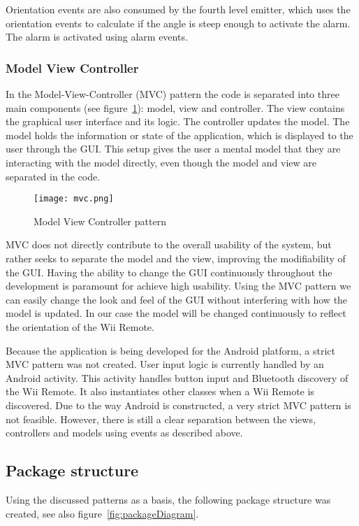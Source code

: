 Orientation events are also consumed by the fourth level emitter, which uses the orientation events to calculate if the angle is steep enough to activate the alarm. The alarm is activated using alarm events.

\subsubsection{Model View Controller}
In the Model-View-Controller (MVC) pattern the code is separated into three main components (see figure~\ref{fig:mvc}): model, view and controller. The view contains the graphical user interface and its logic. The controller updates the model. The model holds the information or state of the application, which is displayed to the user through the GUI. This setup gives the user a mental model that they are interacting with the model directly, even though the model and view are separated in the code.

\begin{figure}[h!]
  \centering
    \texttt{[image: mvc.png]}
    \caption{\footnotesize Model View Controller pattern}
    \label{fig:mvc}
\end{figure}

MVC does not directly contribute to the overall usability of the system, but rather seeks to separate the model and the view, improving the modifiability of the GUI. Having the ability to change the GUI continuously throughout the development is paramount for achieve high usability. Using the MVC pattern we can easily change the look and feel of the GUI without interfering with how the model is updated. In our case the model will be changed continuously to reflect the orientation of the Wii Remote.

Because the application is being developed for the Android platform, a strict MVC pattern was not created. User input logic is currently handled by an Android activity. This activity handles button input and Bluetooth discovery of the Wii Remote. It also instantiates other classes when a Wii Remote is discovered. Due to the way Android is constructed, a very strict MVC pattern is not feasible. However, there is still a clear separation between the views, controllers and models using events as described above.

\subsection{Package structure}
Using the discussed patterns as a basis, the following package structure was created, see also figure~\ref{fig:packageDiagram}.

